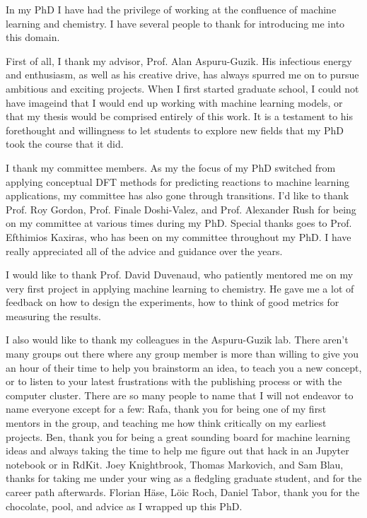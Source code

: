 In my PhD I have had the privilege of working at the confluence of machine learning and chemistry. I have several people to thank for introducing me into this domain.

First of all, I thank my advisor, Prof. Alan Aspuru-Guzik. His infectious energy and enthusiasm, as well as his creative drive, has always spurred me on to pursue ambitious and exciting projects. When I first started graduate school, I could not have imageind that I would end up working with machine learning models, or that my thesis would be comprised entirely of this work. It is a testament to his forethought and willingness to let students to explore new fields that my PhD took the course that it did.

I thank my committee members. As my the focus of my PhD switched from applying conceptual DFT methods for predicting reactions to machine learning applications, my committee has also gone through transitions. I'd like to thank Prof. Roy Gordon, Prof. Finale Doshi-Valez, and Prof. Alexander Rush for being on my committee at various times during my PhD. Special thanks goes to Prof. Efthimios Kaxiras, who has been on my committee throughout my PhD. I have really appreciated all of the advice and guidance over the years.

I would like to thank Prof. David Duvenaud, who patiently mentored me on my very first project in applying machine learning to chemistry. He gave me a lot of feedback on how to design the experiments, how to think of good metrics for measuring the results.

I also would like to thank my colleagues in the Aspuru-Guzik lab.  There aren't many groups out there where any group member is more than willing to give you an hour of their time to help you brainstorm an idea, to teach you a new concept, or to listen to your latest frustrations with the publishing process or with the computer cluster. There are so many people to name that I will not endeavor to name everyone except for a few: Rafa, thank you for being one of my first mentors in the group, and teaching me how think critically on my earliest projects. Ben, thank you for being a great sounding board for machine learning ideas and always taking the time to help me figure out that hack in an Jupyter notebook or in RdKit. Joey Knightbrook, Thomas Markovich, and Sam Blau, thanks for taking me under your wing as a fledgling graduate student, and for the career path afterwards. Florian H{\"a}se, L{\"o}ic Roch, Daniel Tabor,
 thank you for the chocolate, pool, and advice as I wrapped up this PhD.

